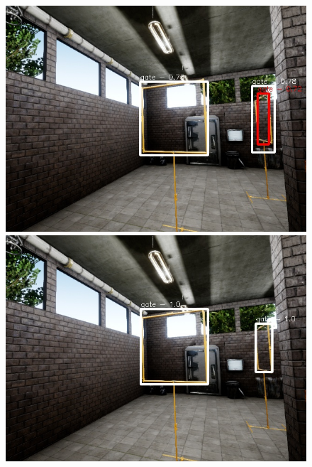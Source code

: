 \documentclass{article}
\begin{document}
\begin{figure}[h]
	\centering
	\begin{minipage}{0.3\linewidth}
		\includegraphics[width=\linewidth]{fig/gate_comp}
	\end{minipage}
	\begin{minipage}{0.3\linewidth}
		\includegraphics[width=\linewidth]{fig/v2_comp}
	\end{minipage}


\end{figure}
\end{document}
